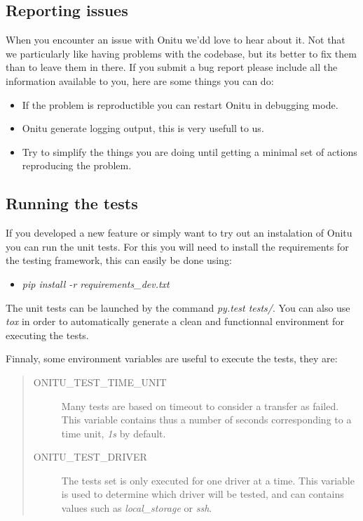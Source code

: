 \documentclass[letterpaper,10pt,english]{sphinxmanual}
\begin{document}
\subsection{Reporting issues}
\label{contribute:reporting-issues}
When you encounter an issue with Onitu we'dd love to hear about it. Not that we particularly like having problems with the codebase, but its better to fix them than to leave them in there.
If you submit a bug report please include all the information available to you, here are some things you can do:
\begin{itemize}
\item {} 
If the problem is reproductible you can restart Onitu in debugging mode.

\item {} 
Onitu generate logging output, this is very usefull to us.

\item {} 
Try to simplify the things you are doing until getting a minimal set of actions reproducing the problem.

\end{itemize}


\subsection{Running the tests}
\label{contribute:tests}\label{contribute:running-the-tests}
If you developed a new feature or simply want to try out an instalation of Onitu you can run the unit tests. For this you will need to install the requirements for the testing framework, this can easily be done using:
\begin{itemize}
\item {} 
\emph{pip install -r requirements\_dev.txt}

\end{itemize}

The unit tests can be launched by the command \emph{py.test tests/}. You can also use \emph{tox} in order to automatically generate a clean and functionnal environment for executing the tests.

Finnaly, some environment variables are useful to execute the tests, they are:
\begin{quote}
\begin{description}
\item[{ONITU\_TEST\_TIME\_UNIT}] \leavevmode
Many tests are based on timeout to consider a transfer as failed. This variable contains thus a number of seconds corresponding to a time unit, \emph{1s} by default.

\item[{ONITU\_TEST\_DRIVER}] \leavevmode
The tests set is only executed for one driver at a time. This variable is used to determine which driver will be tested, and can contains values such as \emph{local\_storage} or \emph{ssh}.

\end{description}
\end{quote}
\end{document}
